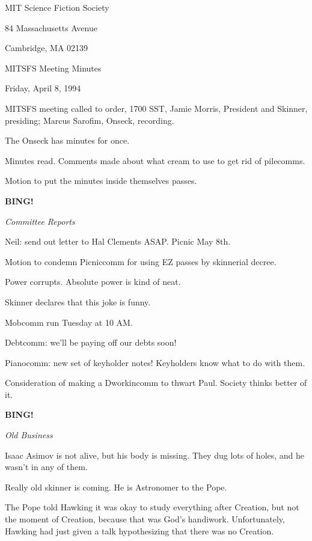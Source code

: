 \documentclass[12pt]{article}
\newcommand{\bing}{{\bf BING!} }
\newcommand{\goto}[1]{\bing \vskip 12pt \centerline{{\em{#1}}}}
\begin{document}
\begin{center}

MIT Science Fiction Society 

84 Massachusetts Avenue

Cambridge, MA 02139

\vspace{12pt}

MITSFS Meeting Minutes 

Friday, April 8, 1994

\end{center}
 
\vspace{18pt}

\setlength{\parskip}{6pt}

\noindent
MITSFS meeting called to order, 1700 SST,
Jamie Morris, President and Skinner, presiding; Marcus Sarofim, Onseck, recording.

The Onseck has minutes for once.

Minutes read. Comments made about what cream to use to get rid of pilecomms.

Motion to put the minutes inside themselves passes.

\goto{Committee Reports}

Neil: send out letter to Hal Clements ASAP. Picnic May 8th.

Motion to condemn Picniccomm for using EZ passes by skinnerial decree.

Power corrupts. Absolute power is kind of neat.

Skinner declares that this joke is funny.

Mobcomm run Tuesday at 10 AM.

Debtcomm: we'll be paying off our debts soon!

Pianocomm: new set of keyholder notes! Keyholders know what to do with them.

Consideration of making a Dworkincomm to thwart Paul. Society thinks better of it.

\goto{Old Business}

Isaac Asimov is not alive, but his body is missing. They dug lots of holes, and he wasn't in any of them.

Really old skinner is coming. He is Astronomer to the Pope.

The Pope told Hawking it was okay to study everything after Creation, but not the moment of Creation, because that was God's handiwork. Unfortunately, Hawking had just given a talk hypothesizing that there was no Creation.
\end{document}
